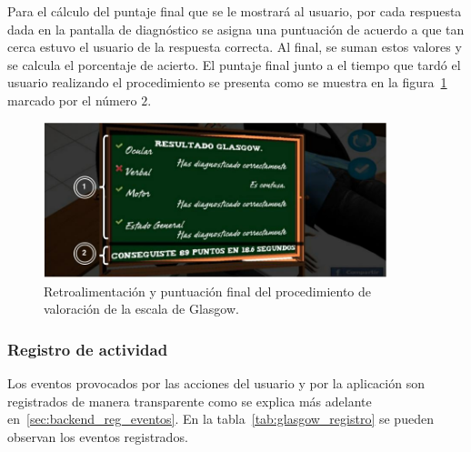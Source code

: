 Para el cálculo del puntaje final que se le mostrará al usuario, por cada
respuesta dada en la pantalla de diagnóstico se asigna una puntuación de acuerdo
a que tan cerca estuvo el usuario de la respuesta correcta. Al final, se suman
estos valores y se calcula el porcentaje de acierto. El puntaje final junto a el
tiempo que tardó el usuario realizando el procedimiento se presenta como se
muestra en la figura~\ref{fig:glasgow_resultado} marcado por el número $2$.

\begin{figure}[H]
\centering
\includegraphics[width=10cm]{solucion/images/glasgow_resultado.jpg}
\caption{Retroalimentación y puntuación final del procedimiento de valoración de 
la escala de Glasgow.}
\label{fig:glasgow_resultado}
\end{figure}


\subsubsection{Registro de actividad}

Los eventos provocados por las acciones del usuario y por la aplicación son
registrados de manera transparente como se explica más adelante
en~\ref{sec:backend_reg_eventos}. En la tabla~\ref{tab:glasgow_registro} se
pueden observan los eventos registrados.




